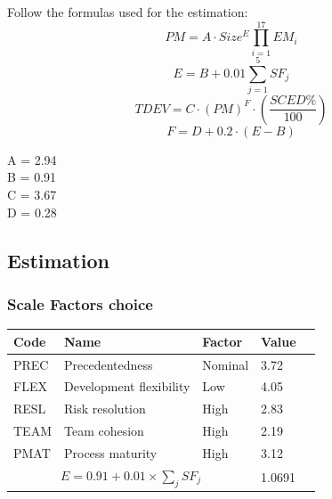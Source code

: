 \documentclass{article}
\begin{document}
		Follow the formulas used for the estimation:
		\begin{equation}
		PM = A\cdot Size^{E}\prod_{i=1}^{17}EM_{i}
		\end{equation}
		\begin{equation}
		E = B + 0.01\sum_{j=1}^{5}SF_{j}
		\end{equation}
		\begin{equation}
		TDEV = C\cdot(PM)^F\cdot (\dfrac {SCED\%}{100})
		\end{equation}
		\begin{equation}
		F = D+0.2\cdot(E-B)
		\end{equation}
		
		\begin{center}
		A = 2.94\\
		B = 0.91\\
		C = 3.67\\
		D = 0.28\\
		\end{center}

		\pagebreak
		
		\subsection{Estimation}
		\subsubsection{Scale Factors choice}
		\begin{table}[h!]
			\centering
			\renewcommand{\arraystretch}{1.4}
			\begin{tabular}{| l | l | l | l | l |}
				\hline
				\textbf{Code}  & \textbf{Name}            & \textbf{Factor}  & \textbf{Value}    \\
				\hline
				PREC           & Precedentedness          & Nominal          & 3.72                 \\
				\hline
				FLEX           & Development flexibility  & Low              & 4.05                 \\
				\hline
				RESL           & Risk resolution          & High             & 2.83                 \\
				\hline
				TEAM           & Team cohesion            & High             & 2.19                 \\
				\hline
				PMAT           & Process maturity         & High             & 3.12                 \\
				\hline
				\multicolumn{3}{|c|}{$E=0.91 + 0.01 \times \sum_{j}SF_j$}    & 1.0691       \\
				\hline
			\end{tabular}
		\end{table}
		
\end{document}
